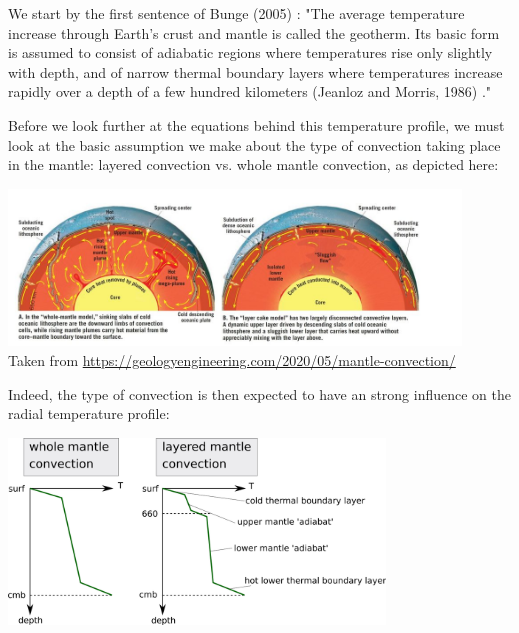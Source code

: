 
We start by the first sentence of Bunge (2005) \cite{bung05}:
"The average temperature increase through Earth's
crust and mantle is called the geotherm. Its basic form is
assumed to consist of adiabatic regions where temperatures 
rise only slightly with depth, and of narrow thermal
boundary layers where temperatures increase rapidly
over a depth of a few hundred kilometers (Jeanloz and
Morris, 1986) \cite{jemo86}."

Before we look further at the equations behind this temperature profile, 
we must look at the basic assumption we make about
the type of convection taking place in the mantle:
layered convection vs. whole mantle convection, as
depicted here: 

\begin{center}
\includegraphics[width=12cm]{images/adiabatic/modes}\\
{\captionfont Taken from \url{https://geologyengineering.com/2020/05/mantle-convection/}}
\end{center}

\noindent Indeed, the type of convection is then expected to have an strong influence 
on the radial temperature profile: 

\begin{center}
\includegraphics[width=10cm]{images/adiabatic/drawing.png}
\end{center}

